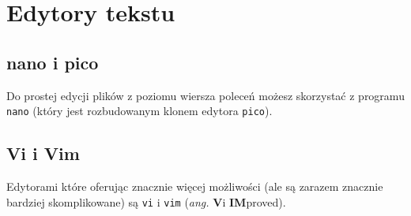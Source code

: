 \section{Edytory tekstu}
\subsection{nano i pico}
Do prostej edycji plików z poziomu wiersza poleceń możesz skorzystać z programu \texttt{nano} (który jest rozbudowanym klonem edytora \texttt{pico}).
\subsection{Vi i Vim}
Edytorami które oferując znacznie więcej możliwości (ale są zarazem znacznie bardziej skomplikowane) są \texttt{vi} i \texttt{vim} (\textit{ang.} \textbf{V}i \textbf{IM}proved).
